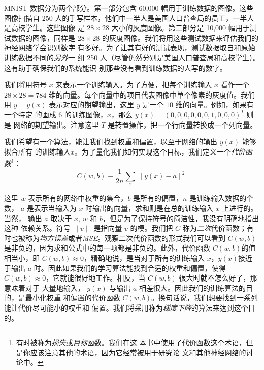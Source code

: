MNIST 数据分为两个部分。第一部分包含 60,000 幅用于训练数据的图像。这些图像扫描自
250 人的手写样本，他们中一半人是美国人口普查局的员工，一半人是高校学生。这些图像
是 $28 \times 28$ 大小的灰度图像。第二部分是 10,000 幅用于测试数据的图像，同样是
$28 \times 28$ 的灰度图像。我们将用这些测试数据来评估我们的神经网络学会识别数字
有多好。为了让其有好的测试表现，测试数据取自和原始训练数据不同的\emph{另外}一
组 250 人（尽管仍然分别是美国人口普查局和高校学生）。这有助于确保我们的系统能识
别那些没有看到训练数据的人写的数字。

我们将用符号 $x$ 来表示一个训练输入。为了方便，把每个训练输入 $x$ 看作一个 $28
\times 28 = 784$ 维的向量。每个向量中的项目代表图像中单个像素的灰度值。我们用 $y
= y(x)$ 表示对应的期望输出，这里 $y$ 是一个 $10$ 维的向量。例如，如果有一个特定
的画成 $6$ 的训练图像，$x$，那么 $y(x) = (0, 0, 0, 0, 0, 0, 1, 0, 0, 0)^T$ 则是
网络的期望输出。注意这里 $T$ 是转置操作，把一个行向量转换成一个列向量。

我们希望有一个算法，能让我们找到权重和偏置，以至于网络的输出 $y(x)$ 能够拟合所有
的训练输入$x$。为了量化我们如何实现这个目标，我们定义一个\emph{代价函
  数}\footnote{有时被称为\emph{损失}或\emph{目标}函数。我们在这
  本书中使用了代价函数这个术语，但是你应该注意其他的术语，因为它经常被用于研究论
  文和其他神经网络的讨论中。}：
\begin{equation}
  C(w,b) \equiv \frac{1}{2n} \sum_x \| y(x) - a\|^2
  \label{eq:6}\tag{6}
\end{equation}

这里 $w$ 表示所有的网络中权重的集合，$b$ 是所有的偏置，$n$ 是训练输入数据的个数，
$a$ 是表示当输入为 $x$ 时输出的向量，求和则是在总的训练输入 $x$ 上进行的。当然，
输出 $a$ 取决于 $x$, $w$ 和 $b$，但是为了保持符号的简洁性，我没有明确地指出这种
依赖关系。符号 $\|v\|$ 是指向量 $v$ 的模。我们把 $C$ 称为\emph{二次}代价函数；有
时也被称为\emph{均方误差}或者\emph{MSE}。观察二次代价函数的形式我们可以看到
$C(w,b)$ 是非负的，因为求和公式中的每一项都是非负的。此外，代价函数 $C(w,b)$的值
相当小，即 $C(w,b) \approx 0$，精确地说，是当对于所有的训练输入 $x$，$y(x)$接近
于输出 $a$ 时。因此如果我们的学习算法能找到合适的权重和偏置，使得 $C(w,b)
\approx 0$，它就能很好地工作。相反，当 $C(w,b)$ 很大时就不怎么好了，那意味着对于
大量地输入， $y(x)$ 与输出 $a$ 相差很大。因此我们的训练算法的目的，是最小化权重
和偏置的代价函数 $C(w,b)$。换句话说，我们想要找到一系列能让代价尽可能小的权重和
偏置。我们将采用称为\emph{梯度下降}的算法来达到这个目的。


